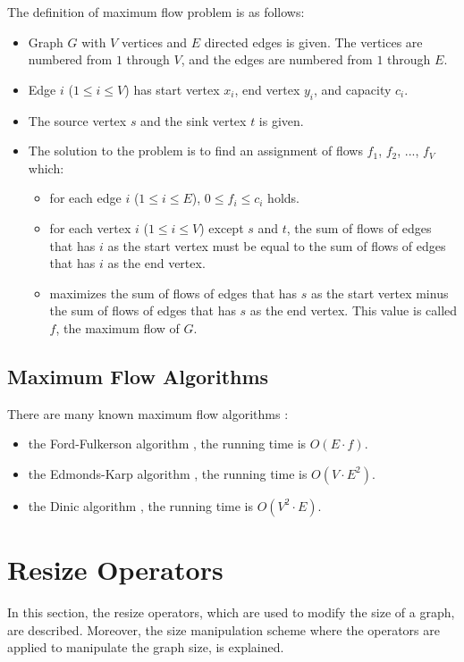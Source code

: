 \documentclass[a4paper, 10pt, conference]{ieeeconf}      %
\begin{document}
The definition of maximum flow problem is as follows:
\begin{itemize}
\item Graph $G$ with $V$ vertices and $E$ directed edges is given. The vertices are numbered from $1$ through $V$, and the edges are numbered from $1$ through $E$.
\item Edge $i$ ($1 \le i \le V$) has start vertex $x_i$, end vertex $y_i$, and capacity $c_i$.
\item The source vertex $s$ and the sink vertex $t$ is given. 
\item The solution to the problem is to find an assignment of flows $f_1$, $f_2$, ..., $f_V$ which:
    \begin{itemize}
    \item for each edge $i$ ($1 \le i \le E$), $0 \le f_i \le c_i$ holds.
    \item for each vertex $i$ ($1 \le i \le V$) except $s$ and $t$, the sum of flows of edges that has $i$ as the start vertex must be equal to the sum of flows of edges that has $i$ as the end vertex.
    \item maximizes the sum of flows of edges that has $s$ as the start vertex minus the sum of flows of edges that has $s$ as the end vertex. This value is called $f$, the maximum flow of $G$.
    \end{itemize}
\end{itemize}

\subsection{Maximum Flow Algorithms}

There are many known maximum flow algorithms \cite{c5}:
\begin{itemize}

\item the Ford-Fulkerson algorithm \cite{c7}, the running time is $O(E \cdot f)$.
\item the Edmonds-Karp algorithm \cite{c2}, the running time is $O(V \cdot E^{2})$.
\item the Dinic algorithm \cite{c3}, the running time is $O(V^{2} \cdot E )$.
\end{itemize}



\section{Resize Operators}
In this section, the resize operators, which are used to modify the size of
a graph, are described. Moreover, the size manipulation scheme where the operators are applied to manipulate the graph size, is explained.
\end{document}
